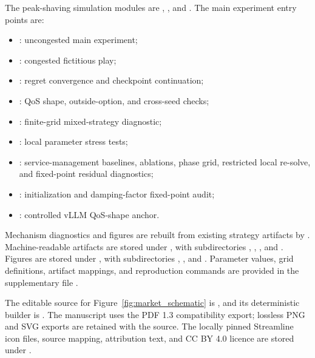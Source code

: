 \documentclass[11pt,a4paper]{article}
\begin{document}
The peak-shaving simulation modules are ,
, and
. The main experiment entry points are:
\begin{itemize}[leftmargin=2em]
  \item {}: uncongested main experiment;
  \item {}: congested fictitious play;
  \item {}: regret convergence and checkpoint continuation;
  \item {}: QoS shape, outside-option, and cross-seed checks;
  \item {}: finite-grid mixed-strategy diagnostic;
  \item {}: local parameter stress tests;
  \item {}: service-management baselines, ablations, phase grid, restricted local re-solve, and fixed-point residual diagnostics;
  \item {}: initialization and damping-factor fixed-point audit;
  \item {}: controlled vLLM QoS-shape anchor.
\end{itemize}
Mechanism diagnostics and figures are rebuilt from existing strategy artifacts by
. Machine-readable artifacts are stored under
, with subdirectories , ,
, and . Figures are stored under , with subdirectories
, , and . Parameter values, grid definitions, artifact mappings, and reproduction commands are provided in the supplementary file
.

The editable source for Figure~\ref{fig:market_schematic} is , and its deterministic builder is . The manuscript uses the PDF 1.3 compatibility export; lossless PNG and SVG exports are retained with the source. The locally pinned Streamline icon files, source mapping, attribution text, and CC BY 4.0 licence are stored under .
\end{document}
